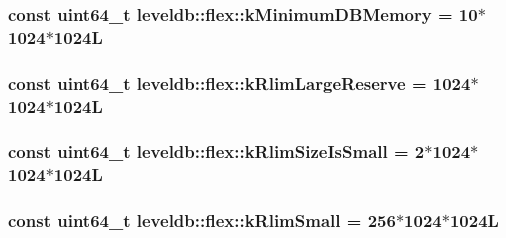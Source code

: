 \subsubsection[{k\+Minimum\+D\+B\+Memory}]{\setlength{\rightskip}{0pt plus 5cm}const {\bf uint64\+\_\+t} leveldb\+::flex\+::k\+Minimum\+D\+B\+Memory = 10$\ast$1024$\ast$1024\+L\hspace{0.3cm}{\ttfamily [static]}}\label{namespaceleveldb_1_1flex_abf27c14156b752e9b1f40910e02650a9}
\hypertarget{namespaceleveldb_1_1flex_aa93b23239803953fdb50d685ae6c07cc}{}
\subsubsection[{k\+Rlim\+Large\+Reserve}]{\setlength{\rightskip}{0pt plus 5cm}const {\bf uint64\+\_\+t} leveldb\+::flex\+::k\+Rlim\+Large\+Reserve = 1024$\ast$1024$\ast$1024\+L\hspace{0.3cm}{\ttfamily [static]}}\label{namespaceleveldb_1_1flex_aa93b23239803953fdb50d685ae6c07cc}
\hypertarget{namespaceleveldb_1_1flex_af09b08660faa7ab237dcb9aa82bc5bab}{}
\subsubsection[{k\+Rlim\+Size\+Is\+Small}]{\setlength{\rightskip}{0pt plus 5cm}const {\bf uint64\+\_\+t} leveldb\+::flex\+::k\+Rlim\+Size\+Is\+Small = 2$\ast$1024$\ast$1024$\ast$1024\+L\hspace{0.3cm}{\ttfamily [static]}}\label{namespaceleveldb_1_1flex_af09b08660faa7ab237dcb9aa82bc5bab}
\hypertarget{namespaceleveldb_1_1flex_a5fe4e3d0496afe8a7e9902a7819ec9fa}{}
\subsubsection[{k\+Rlim\+Small}]{\setlength{\rightskip}{0pt plus 5cm}const {\bf uint64\+\_\+t} leveldb\+::flex\+::k\+Rlim\+Small = 256$\ast$1024$\ast$1024\+L\hspace{0.3cm}{\ttfamily [static]}}\label{namespaceleveldb_1_1flex_a5fe4e3d0496afe8a7e9902a7819ec9fa}
